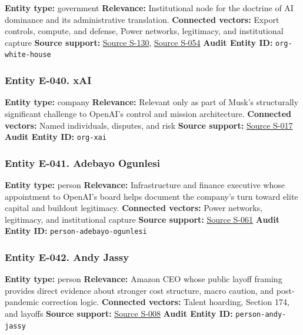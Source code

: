 \documentclass[
  american,
  11pt,
  letterpaper,
]{article}
\begin{document}
\textbf{Entity type:} government \textbf{Relevance:} Institutional node
for the doctrine of AI dominance and its administrative translation.
\textbf{Connected vectors:} Export controls, compute, and defense, Power
networks, legitimacy, and institutional capture \textbf{Source support:}
\hyperref[source-s-130-removing-barriers-to-american-leadership-in-artificial-intelligence]{Source
S-130},
\hyperref[source-s-054-request-for-information-on-the-development-of-an-artificial-intelligence-ai-action-plan]{Source
S-054} \textbf{Audit Entity ID:} \texttt{org-white-house}

\subsubsection{Entity E-040. xAI}\label{entity-e-040-xai}

\textbf{Entity type:} company \textbf{Relevance:} Relevant only as part
of Musk's structurally significant challenge to OpenAI's control and
mission architecture. \textbf{Connected vectors:} Named individuals,
disputes, and risk \textbf{Source support:}
\hyperref[source-s-017-openai-board-unanimously-rejects-elon-musk-s-97-4-billion-proposal]{Source
S-017} \textbf{Audit Entity ID:} \texttt{org-xai}

\subsubsection{Entity E-041. Adebayo
Ogunlesi}\label{entity-e-041-adebayo-ogunlesi}

\textbf{Entity type:} person \textbf{Relevance:} Infrastructure and
finance executive whose appointment to OpenAI's board helps document the
company's turn toward elite capital and buildout legitimacy.
\textbf{Connected vectors:} Power networks, legitimacy, and
institutional capture \textbf{Source support:}
\hyperref[source-s-061-openai-appoints-one-of-wall-street-s-most-powerful-dealmakers-to-its-board]{Source
S-061} \textbf{Audit Entity ID:} \texttt{person-adebayo-ogunlesi}

\subsubsection{Entity E-042. Andy Jassy}\label{entity-e-042-andy-jassy}

\textbf{Entity type:} person \textbf{Relevance:} Amazon CEO whose public
layoff framing provides direct evidence about stronger cost structure,
macro caution, and post-pandemic correction logic. \textbf{Connected
vectors:} Talent hoarding, Section 174, and layoffs \textbf{Source
support:}
\hyperref[source-s-008-amazon-salesforce-jettison-jobs-in-latest-tech-worker-purge]{Source
S-008} \textbf{Audit Entity ID:} \texttt{person-andy-jassy}
\end{document}
